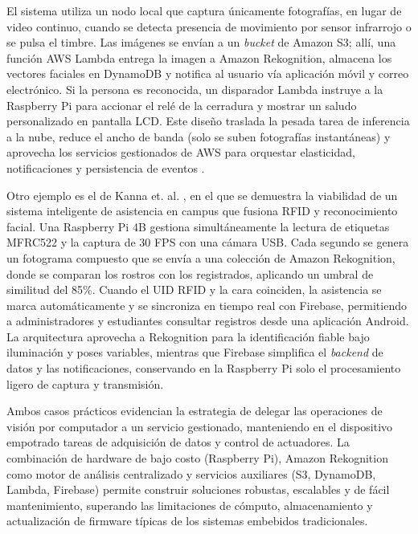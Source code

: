 El sistema utiliza un nodo local que captura únicamente fotografías, en lugar de video continuo, cuando se detecta presencia de movimiento por sensor infrarrojo o se pulsa el timbre. Las imágenes se envían a un \textit{bucket} de Amazon S3; allí, una función AWS Lambda entrega la imagen a Amazon Rekognition, almacena los vectores faciales en DynamoDB y notifica al usuario vía aplicación móvil y correo electrónico. Si la persona es reconocida, un disparador Lambda instruye a la Raspberry Pi para accionar el relé de la cerradura y mostrar un saludo personalizado en pantalla LCD. Este diseño traslada la pesada tarea de inferencia a la nube, reduce el ancho de banda (solo se suben fotografías instantáneas) y aprovecha los servicios gestionados de AWS para orquestar elasticidad, notificaciones y persistencia de eventos \cite{patel_image_2020}.

Otro ejemplo es el de Kanna et. al. \cite{kanna_smart_2021}, en el que se demuestra la viabilidad de un sistema inteligente de asistencia en campus que fusiona RFID y reconocimiento facial. Una Raspberry Pi 4B gestiona simultáneamente la lectura de etiquetas MFRC522 y la captura de 30 FPS con una cámara USB. Cada segundo se genera un fotograma compuesto que se envía a una colección de Amazon Rekognition, donde se comparan los rostros con los registrados, aplicando un umbral de similitud del 85\%. Cuando el UID RFID y la cara coinciden, la asistencia se marca automáticamente y se sincroniza en tiempo real con Firebase, permitiendo a administradores y estudiantes consultar registros desde una aplicación Android. La arquitectura aprovecha a Rekognition para la identificación fiable bajo iluminación y poses variables, mientras que Firebase simplifica el \textit{backend} de datos y las notificaciones, conservando en la Raspberry Pi solo el procesamiento ligero de captura y transmisión.

Ambos casos prácticos evidencian la estrategia de delegar las operaciones de visión por computador a un servicio gestionado, manteniendo en el dispositivo empotrado tareas de adquisición de datos y control de actuadores. La combinación de hardware de bajo costo (Raspberry Pi), Amazon Rekognition como motor de análisis centralizado y servicios auxiliares (S3, DynamoDB, Lambda, Firebase) permite construir soluciones robustas, escalables y de fácil mantenimiento, superando las limitaciones de cómputo, almacenamiento y actualización de firmware típicas de los sistemas embebidos tradicionales.
